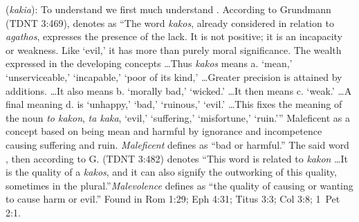 \item[Malevolence,]

(\textit{kakia}):
To understand  we first much understand . According to Grundmann (TDNT 3:469),  denotes as ``The word \emph{kakos}, already considered in relation to \emph{agathos}, expresses the presence of the lack. It is not positive; it is an incapacity or weakness. Like `evil,' it has more than purely moral significance. The wealth expressed in the developing concepts \ldots Thus \emph{kakos} means a. `mean,' `unserviceable,' `incapable,' `poor of its kind,' \ldots Greater precision is attained by additions. \ldots It also means b. `morally bad,' `wicked.' \ldots It then means c. `weak.' \ldots A final meaning d. is `unhappy,' `bad,' `ruinous,' `evil.' \ldots This fixes the meaning of the noun \emph{to kakon}, \emph{ta kaka}, `evil,' `suffering,' `misfortune,' `ruin.''' Maleficent as a concept based on being mean and harmful by ignorance and incompetence causing suffering and ruin. \emph{Maleficent} defines as ``bad or harmful.'' The said word , then according to G. (TDNT 3:482) denotes ``This word is related to \emph{kakon} \ldots It is the quality of a \emph{kakos}, and it can also signify the outworking of this quality, sometimes in the plural.''\emph{Malevolence} defines as ``the quality of causing or wanting to cause harm or evil.''
Found in Rom 1:29; Eph 4:31; Titus 3:3; Col 3:8; 1~Pet 2:1.
